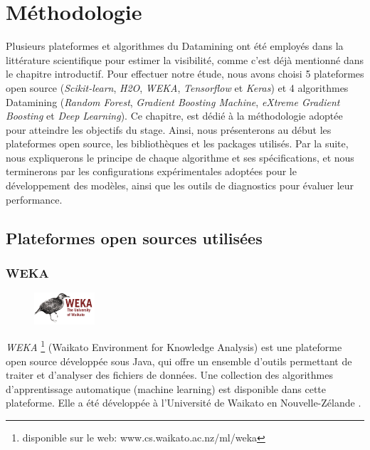 \chapter[Méthodologie]{Méthodologie}
\label{Methodologie}

\chapterabstract
{Plusieurs plateformes et algorithmes du Datamining ont été employés dans la littérature scientifique pour estimer la visibilité, comme c'est déjà mentionné dans le chapitre introductif. Pour effectuer notre étude, nous avons choisi 
 5 plateformes open source (\textit{Scikit-learn}, \textit{H2O}, \textit{WEKA}, \textit{Tensorflow} et \textit{Keras}) et 4 algorithmes Datamining (\textit{Random Forest}, \textit{Gradient Boosting Machine}, \textit{eXtreme Gradient Boosting} et \textit{Deep Learning}).
Ce chapitre, est dédié  à la méthodologie adoptée pour atteindre les objectifs du stage. Ainsi, nous présenterons au début les plateformes open source, les bibliothèques et les packages utilisés. Par la suite, nous expliquerons le principe de chaque algorithme et ses spécifications, et nous terminerons par les configurations expérimentales adoptées pour le développement des modèles, ainsi que les outils de diagnostics pour évaluer leur performance.}
\pagestyle{plain}

\section{Plateformes open sources utilisées}\label{plref}
\subsection{WEKA}\label{defWeka}
\begin{figure}
    \includegraphics[width=0.2\textwidth]{img/wekalogo.png}
\end{figure}
\textit{WEKA} \footnote{disponible sur le web: www.cs.waikato.ac.nz/ml/weka} (Waikato Environment for Knowledge Analysis) est une plateforme open source développée sous Java, qui offre un ensemble d’outils permettant de traiter et d’analyser des fichiers de données. Une collection des algorithmes d'apprentissage automatique (machine learning) est disponible dans cette plateforme. Elle a été développée à l'Université de Waikato en Nouvelle-Zélande \citep{witten2016data}. \\

